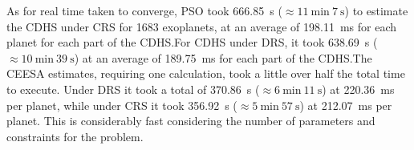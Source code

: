 \documentclass[10pt]{article}
\newcommand{\pso}{Particle Swarm Optimization}
\DeclareMathOperator*{\gbest}{\mathit{gbest}}
\begin{document}
As for real time taken to converge, PSO took \SI{666.85}{\second} ($\approx\SI{11}{\minute}\ \SI{7}{\second}$) to
estimate the CDHS under CRS for \num{1683} exoplanets, at an average of \SI{198.11}{\milli\second} for each planet for
each part of the CDHS.\@ For CDHS under DRS, it took \SI{638.69}{\second} ($\approx\SI{10}{\minute}\ \SI{39}{\second}$)
at an average of \SI{189.75}{\milli\second} for each part of the CDHS.\@ The CEESA estimates, requiring one calculation,
took a little over half the total time to execute. Under DRS it took a total of \SI{370.86}{\second}
($\approx\SI{6}{\minute}\ \SI{11}{\second}$) at \SI{220.36}{\milli\second} per planet, while under CRS it took
\SI{356.92}{\second} ($\approx\SI{5}{\minute}\ \SI{57}{\second}$) at \SI{212.07}{\milli\second} per planet. This is
considerably fast considering the number of parameters and constraints for the problem.


\begin{table}
  \centering
  \begin{subtable}{\textwidth}
    \centering
    
    \caption{Estimated habitability scores under CRS.}\label{tab:cdhscrs}
  \end{subtable}

  \vspace{4em}

  \begin{subtable}{\textwidth}
    \centering
    
    \caption{Estimated habitability scores under DRS.}\label{tab:cdhsdrs}
  \end{subtable}
  \caption{Cobb-Douglas Habitability Scores as estimated by \pso.\\
    \footnotesize $\alpha$, $\beta$, $\gamma$ and $\delta$ record the parameters of Equation~\ref{eq:cdhscrs} in
    Table~\ref{tab:cdhscrs} and the parameters of Equation~\ref{eq:cdhsdrs} in Table~\ref{tab:cdhsdrs}. $Y_i$ and $Y_s$
    record the maxima for the objective functions. $i_i$ and $i_s$ specify the number of iterations taken to converge to
    a stable $\gbest$ value. Under the Class column there are four categories for the planets --- Psychroplanets (psy),
    Mesoplanets (mes), Non-Habitable planets (non) and Hypopsychroplanets (hyp).  $\mathit{CDHS}$ is the final score
    with $w_i=0.99$ and $w_s=0.01$.
  }
\end{table}
\end{document}
